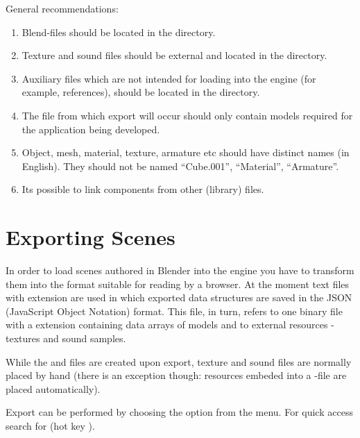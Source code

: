 \documentclass[a4paper,12pt,oneside]{sphinxmanual}
\begin{document}
General recommendations:
\begin{enumerate}
\item {} 
Blend-files should be located in the  directory.

\item {} 
Texture and sound files should be external and located in the  directory.

\item {} 
Auxiliary files which are not intended for loading into the engine (for example, references), should be located in the  directory.

\item {} 
The file from which export will occur should only contain models required for the application being developed.

\item {} 
Object, mesh, material, texture, armature etc should have distinct names (in English). They should not be named ``Cube.001'', ``Material'', ``Armature''.

\item {} 
Its possible to link components from other (library) files.

\end{enumerate}


\section{Exporting Scenes}
\label{workflow:index-0}\label{workflow:id3}
In order to load scenes authored in Blender into the engine you have to transform them into the format suitable for reading by a browser. At the moment text files with  extension are used in which exported data structures are saved in the JSON (JavaScript Object Notation) format. This file, in turn, refers to one binary file with a  extension containing data arrays of models and to external resources - textures and sound samples.

While the  and  files are created upon export, texture and sound files are normally placed by hand (there is an exception though: resources embeded into a -file are placed automatically).

Export can be performed by choosing the  option from the  menu. For quick access search for  (hot key ).
\end{document}
